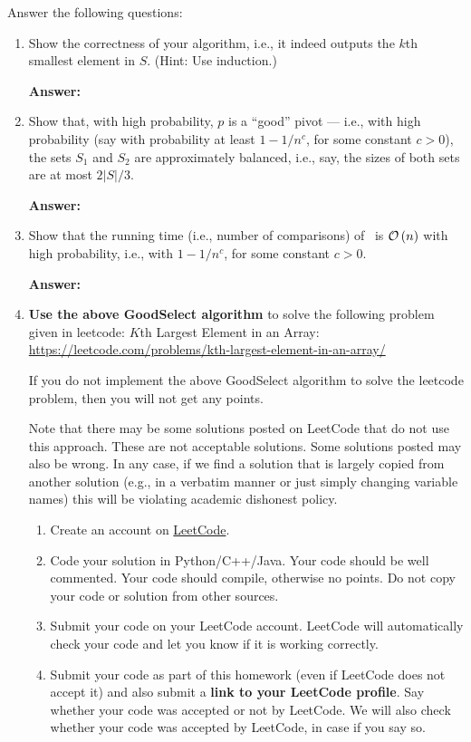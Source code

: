 \documentclass[11pt]{article}
\begin{document}
    
Answer the following questions:
    \begin{enumerate}
    \item  Show the correctness of your algorithm, i.e., it indeed outputs the $k$th smallest element in $S$.
    (Hint: Use induction.) 

        \textbf{Answer:}
        
        \item Show that, with high probability, $p$ is a ``good'' pivot --- i.e., with high probability (say with probability at least $1-1/n^c$, for some constant $c>0$),  the sets $S_1$ and $S_2$ are approximately balanced, i.e., say, the sizes of both sets are at most $2|S|/3$.

        \textbf{Answer:}
        
        \item Show that the running time (i.e., number of comparisons) of~ is $\mathcal{O}\left(n\right)$ with high probability, i.e., with  $1-1/n^c$, for some constant $c>0$.

        \textbf{Answer:}

\item {\bf Use the above GoodSelect algorithm} to solve the following problem given in leetcode: $K$th Largest Element in an Array: \\
\url{https://leetcode.com/problems/kth-largest-element-in-an-array/}

If you do not implement the above GoodSelect  algorithm to solve the leetcode problem, then you will not get any points.

Note that there may be some solutions posted on LeetCode that do not use this approach.  These are not acceptable solutions. Some solutions posted may also be wrong. In any case,
if we find a solution that is largely copied from another solution (e.g., in a verbatim manner or just simply changing variable names) this will be violating academic dishonest policy.


\begin{enumerate}[label=\textbf{(\alph*)}]
    
    
          \item Create an account on \href{https://leetcode.com/}{LeetCode}.   
           
    \item  Code your solution in Python/C++/Java. Your code should be well commented. Your code should compile, otherwise no points. Do not copy your code or solution from other sources.
    
          \item Submit your code on your LeetCode account. LeetCode will automatically check your code and let you know if it is working correctly.
   
    \item Submit your code as part of this homework  (even if LeetCode does not accept it) and also submit a {\bf link to your LeetCode profile}. Say whether your code was accepted or not by LeetCode. We will also check whether your code was accepted by LeetCode, in case if you say so.
\end{enumerate}

\end{enumerate}
\end{document}
